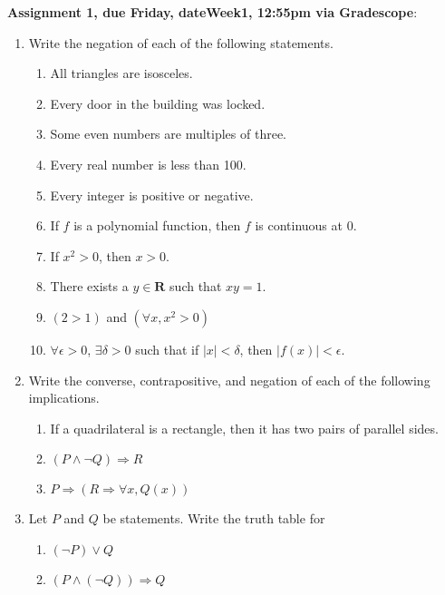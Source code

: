 \documentclass[12pt]{article}
\newcommand{\HWdueTime}{12:55pm }
\begin{document}
\noindent \textbf{Assignment 1, due Friday, \csname dateWeek1\endcsname, \HWdueTime via Gradescope}:
\begin{enumerate}

\item Write the negation of each of the following statements.

 \begin{enumerate}
\item All triangles are isosceles.
\item Every door in the building was locked.
\item Some even numbers are multiples of three.
\item Every real number is less than 100.
\item Every integer is positive or negative.
\item If $f$ is a polynomial function, then $f$ is continuous at $0$.
\item If $x^2 > 0$, then $x > 0$.
\item There exists a $y \in \mathbf{R}$ such that $xy = 1$.
\item $(2 > 1)$ and $(\forall x, x^2 > 0)$
\item $\forall \epsilon > 0$, $\exists \delta > 0$ such that if $|x| < \delta$, then $|f(x)| < \epsilon$.
\end{enumerate}

\item Write the converse, contrapositive, and negation of each of the following implications.

 \begin{enumerate}
\item If a quadrilateral is a rectangle, then it has two pairs of parallel sides.
\item $(P \wedge \neg Q) \Rightarrow R$
\item $P  \Rightarrow (R \Rightarrow \forall x, Q(x))$
\end{enumerate}

\item Let $P$ and $Q$ be statements. Write the truth table for
  \begin{enumerate}
  \item $(\neg P) \vee Q$
  \item $(P \wedge (\neg Q)) \Rightarrow Q$
  \end{enumerate}


\end{enumerate}
\end{document}
